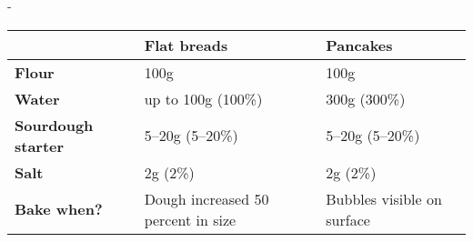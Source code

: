 -\begin{tabular}{lll}
\toprule
                           & \textbf{Flat breads}               & \textbf{Pancakes}          \\ \midrule
\textbf{Flour}             & 100g                               & 100g                       \\ 
\textbf{Water}             & up to 100g (100\%)                       & 300g (300\%)               \\ 
\textbf{Sourdough starter} & 5--20g (5--20\%)                   & 5--20g (5--20\%)           \\ 
\textbf{Salt}              & 2g (2\%)                           & 2g (2\%)                   \\ 
\textbf{Bake when?}        & Dough increased 50 percent in size & Bubbles visible on surface \\ \bottomrule
\end{tabular}
